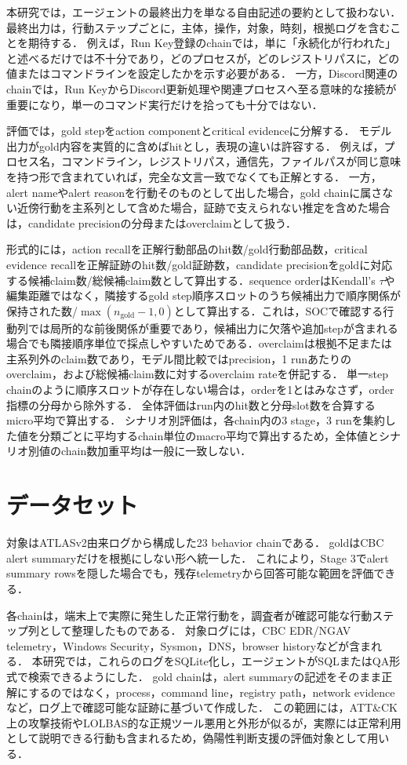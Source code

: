 \documentclass[a4paper,twocolumn,10pt]{article}
\begin{document}
本研究では，エージェントの最終出力を単なる自由記述の要約として扱わない．
最終出力は，行動ステップごとに，主体，操作，対象，時刻，根拠ログを含むことを期待する．
例えば，Run Key登録のchainでは，単に「永続化が行われた」と述べるだけでは不十分であり，どのプロセスが，どのレジストリパスに，どの値またはコマンドラインを設定したかを示す必要がある．
一方，Discord関連のchainでは，Run KeyからDiscord更新処理や関連プロセスへ至る意味的な接続が重要になり，単一のコマンド実行だけを拾っても十分ではない．

評価では，gold stepをaction componentとcritical evidenceに分解する．
モデル出力がgold内容を実質的に含めばhitとし，表現の違いは許容する．
例えば，プロセス名，コマンドライン，レジストリパス，通信先，ファイルパスが同じ意味を持つ形で含まれていれば，完全な文言一致でなくても正解とする．
一方，alert nameやalert reasonを行動そのものとして出した場合，gold chainに属さない近傍行動を主系列として含めた場合，証跡で支えられない推定を含めた場合は，candidate precisionの分母またはoverclaimとして扱う．

形式的には，action recallを正解行動部品のhit数/gold行動部品数，critical evidence recallを正解証跡のhit数/gold証跡数，candidate precisionをgoldに対応する候補claim数/総候補claim数として算出する．sequence orderはKendall's $\tau$や編集距離ではなく，隣接するgold step順序スロットのうち候補出力で順序関係が保持された数/\(\max(n_{\mathrm{gold}}-1,0)\)として算出する．これは，SOCで確認する行動列では局所的な前後関係が重要であり，候補出力に欠落や追加stepが含まれる場合でも隣接順序単位で採点しやすいためである．overclaimは根拠不足または主系列外のclaim数であり，モデル間比較ではprecision，1 runあたりのoverclaim，および総候補claim数に対するoverclaim rateを併記する．
単一step chainのように順序スロットが存在しない場合は，orderを1とはみなさず，order指標の分母から除外する．
全体評価はrun内のhit数と分母slot数を合算するmicro平均で算出する．
シナリオ別評価は，各chain内の3 stage，3 runを集約した値を分類ごとに平均するchain単位のmacro平均で算出するため，全体値とシナリオ別値のchain数加重平均は一般に一致しない．

\section{データセット}

対象はATLASv2由来ログ\cite{atlasv2}から構成した23 behavior chainである．
goldはCBC alert summaryだけを根拠にしない形へ統一した．
これにより，Stage 3でalert summary rowsを隠した場合でも，残存telemetryから回答可能な範囲を評価できる．

各chainは，端末上で実際に発生した正常行動を，調査者が確認可能な行動ステップ列として整理したものである．
対象ログには，CBC EDR/NGAV telemetry，Windows Security，Sysmon\cite{sysmon}，DNS，browser historyなどが含まれる．
本研究では，これらのログをSQLite化し，エージェントがSQLまたはQA形式で検索できるようにした．
gold chainは，alert summaryの記述をそのまま正解にするのではなく，process，command line，registry path，network evidenceなど，ログ上で確認可能な証跡に基づいて作成した．
この範囲には，ATT\&CK上の攻撃技術やLOLBAS的な正規ツール悪用と外形が似るが，実際には正常利用として説明できる行動も含まれるため，偽陽性判断支援の評価対象として用いる．
\end{document}
